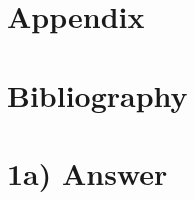\documentclass[%
oneside,                 %
final,                   %
10pt]{article}
\begin{document}
\section{Appendix}

\section{Bibliography}





\section{1a) Answer}
\end{document}
